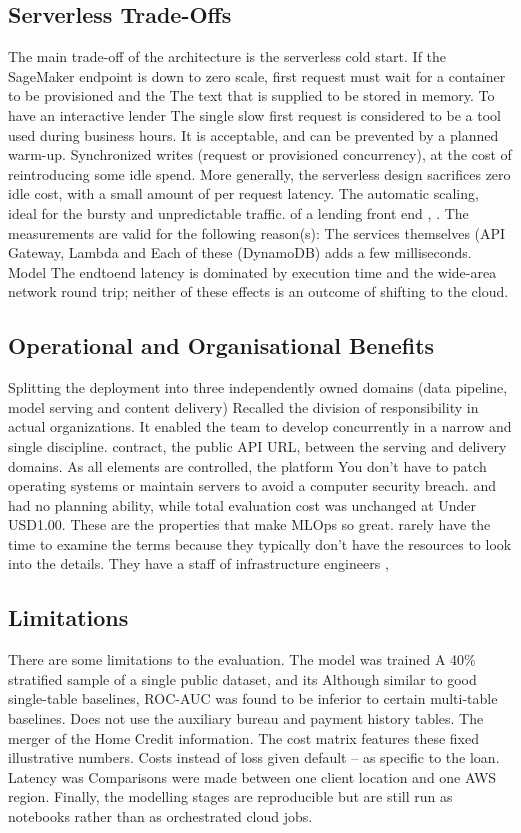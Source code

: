 \documentclass[conference]{IEEEtran}
\begin{document}
\subsection{Serverless Trade-Offs}
The main trade-off of the architecture is the serverless cold
start. If the SageMaker endpoint is down to zero scale,
first request must wait for a container to be provisioned and the
The text that is supplied to be stored in memory. To have an interactive lender
The single slow first request is considered to be a tool used during business hours.
It is acceptable, and can be prevented by a planned warm-up.
Synchronized writes (request or provisioned concurrency), at the cost of reintroducing
some idle spend. More generally, the serverless design sacrifices
zero idle cost, with a small amount of per request latency.
The automatic scaling, ideal for the bursty and unpredictable traffic.
of a lending front end \cite{1}, \cite{7}. The measurements are valid for the following reason(s):
The services themselves (API Gateway, Lambda and
Each of these (DynamoDB) adds a few milliseconds. Model
The endtoend latency is dominated by execution time and the wide-area network round trip; neither of these effects is an outcome of shifting to the
cloud.

\subsection{Operational and Organisational Benefits}
Splitting the deployment into three independently owned
domains (data pipeline, model serving and content delivery)
Recalled the division of responsibility in actual organizations.
It enabled the team to develop concurrently in a narrow and single discipline.
contract, the public API URL, between the serving and delivery
domains. As all elements are controlled, the platform
You don't have to patch operating systems or maintain servers to avoid a computer security breach.
and had no planning ability, while total evaluation cost was unchanged at
Under USD1.00. These are the properties that make MLOps so great.
rarely have the time to examine the terms because they typically don't have the resources to look into the details.
They have a staff of infrastructure engineers \cite{5}, \cite{11}

\subsection{Limitations}
There are some limitations to the evaluation. The model was trained
A 40\% stratified sample of a single public dataset, and its
Although similar to good single-table baselines, ROC-AUC was found to be inferior to certain multi-table baselines.
Does not use the auxiliary bureau and payment history tables.
The merger of the Home Credit information. The cost matrix features these fixed illustrative numbers.
Costs instead of loss given default – as specific to the loan. Latency was
Comparisons were made between one client location and one AWS region.
Finally, the modelling stages are reproducible but are still run
as notebooks rather than as orchestrated cloud jobs.
\end{document}
